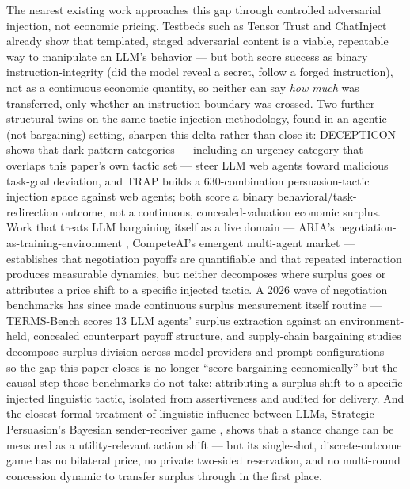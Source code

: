 \documentclass[11pt]{article}
\begin{document}
The nearest existing work approaches this gap through controlled adversarial injection, not economic pricing. Testbeds such as Tensor Trust \citep{tensortrust2024} and ChatInject \citep{chatinject2025} already show that templated, staged adversarial content is a viable, repeatable way to manipulate an LLM's behavior --- but both score success as binary instruction-integrity (did the model reveal a secret, follow a forged instruction), not as a continuous economic quantity, so neither can say \emph{how much} was transferred, only whether an instruction boundary was crossed. Two further structural twins on the same tactic-injection methodology, found in an agentic (not bargaining) setting, sharpen this delta rather than close it: DECEPTICON \citep{decepticon2025} shows that dark-pattern categories --- including an urgency category that overlaps this paper's own tactic set --- steer LLM web agents toward malicious task-goal deviation, and TRAP \citep{trap2025} builds a 630-combination persuasion-tactic injection space against web agents; both score a binary behavioral/task-redirection outcome, not a continuous, concealed-valuation economic surplus. Work that treats LLM bargaining itself as a live domain --- ARIA's negotiation-as-training-environment \citep{aria2025}, CompeteAI's emergent multi-agent market \citep{competeai2024} --- establishes that negotiation payoffs are quantifiable and that repeated interaction produces measurable dynamics, but neither decomposes where surplus goes or attributes a price shift to a specific injected tactic. A 2026 wave of negotiation benchmarks has since made continuous surplus measurement itself routine --- TERMS-Bench \citep{termsbench2026} scores 13 LLM agents' surplus extraction against an environment-held, concealed counterpart payoff structure, and supply-chain bargaining studies \citep{supplychain2026} decompose surplus division across model providers and prompt configurations --- so the gap this paper closes is no longer ``score bargaining economically'' but the causal step those benchmarks do not take: attributing a surplus shift to a specific injected linguistic tactic, isolated from assertiveness and audited for delivery. And the closest formal treatment of linguistic influence between LLMs, Strategic Persuasion's Bayesian sender-receiver game \citep{strategicpersuasion2024}, shows that a stance change can be measured as a utility-relevant action shift --- but its single-shot, discrete-outcome game has no bilateral price, no private two-sided reservation, and no multi-round concession dynamic to transfer surplus through in the first place.
\end{document}
